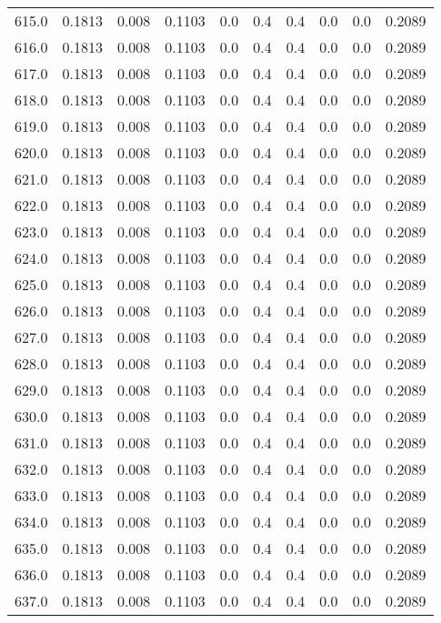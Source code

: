 \begin{longtable}{lrrrrrrrrr}
615.0 & 0.1813 & 0.008 & 0.1103 & 0.0 & 0.4 & 0.4 & 0.0 & 0.0 & 0.2089 \\
616.0 & 0.1813 & 0.008 & 0.1103 & 0.0 & 0.4 & 0.4 & 0.0 & 0.0 & 0.2089 \\
617.0 & 0.1813 & 0.008 & 0.1103 & 0.0 & 0.4 & 0.4 & 0.0 & 0.0 & 0.2089 \\
618.0 & 0.1813 & 0.008 & 0.1103 & 0.0 & 0.4 & 0.4 & 0.0 & 0.0 & 0.2089 \\
619.0 & 0.1813 & 0.008 & 0.1103 & 0.0 & 0.4 & 0.4 & 0.0 & 0.0 & 0.2089 \\
620.0 & 0.1813 & 0.008 & 0.1103 & 0.0 & 0.4 & 0.4 & 0.0 & 0.0 & 0.2089 \\
621.0 & 0.1813 & 0.008 & 0.1103 & 0.0 & 0.4 & 0.4 & 0.0 & 0.0 & 0.2089 \\
622.0 & 0.1813 & 0.008 & 0.1103 & 0.0 & 0.4 & 0.4 & 0.0 & 0.0 & 0.2089 \\
623.0 & 0.1813 & 0.008 & 0.1103 & 0.0 & 0.4 & 0.4 & 0.0 & 0.0 & 0.2089 \\
624.0 & 0.1813 & 0.008 & 0.1103 & 0.0 & 0.4 & 0.4 & 0.0 & 0.0 & 0.2089 \\
625.0 & 0.1813 & 0.008 & 0.1103 & 0.0 & 0.4 & 0.4 & 0.0 & 0.0 & 0.2089 \\
626.0 & 0.1813 & 0.008 & 0.1103 & 0.0 & 0.4 & 0.4 & 0.0 & 0.0 & 0.2089 \\
627.0 & 0.1813 & 0.008 & 0.1103 & 0.0 & 0.4 & 0.4 & 0.0 & 0.0 & 0.2089 \\
628.0 & 0.1813 & 0.008 & 0.1103 & 0.0 & 0.4 & 0.4 & 0.0 & 0.0 & 0.2089 \\
629.0 & 0.1813 & 0.008 & 0.1103 & 0.0 & 0.4 & 0.4 & 0.0 & 0.0 & 0.2089 \\
630.0 & 0.1813 & 0.008 & 0.1103 & 0.0 & 0.4 & 0.4 & 0.0 & 0.0 & 0.2089 \\
631.0 & 0.1813 & 0.008 & 0.1103 & 0.0 & 0.4 & 0.4 & 0.0 & 0.0 & 0.2089 \\
632.0 & 0.1813 & 0.008 & 0.1103 & 0.0 & 0.4 & 0.4 & 0.0 & 0.0 & 0.2089 \\
633.0 & 0.1813 & 0.008 & 0.1103 & 0.0 & 0.4 & 0.4 & 0.0 & 0.0 & 0.2089 \\
634.0 & 0.1813 & 0.008 & 0.1103 & 0.0 & 0.4 & 0.4 & 0.0 & 0.0 & 0.2089 \\
635.0 & 0.1813 & 0.008 & 0.1103 & 0.0 & 0.4 & 0.4 & 0.0 & 0.0 & 0.2089 \\
636.0 & 0.1813 & 0.008 & 0.1103 & 0.0 & 0.4 & 0.4 & 0.0 & 0.0 & 0.2089 \\
637.0 & 0.1813 & 0.008 & 0.1103 & 0.0 & 0.4 & 0.4 & 0.0 & 0.0 & 0.2089 \\

\end{longtable}
